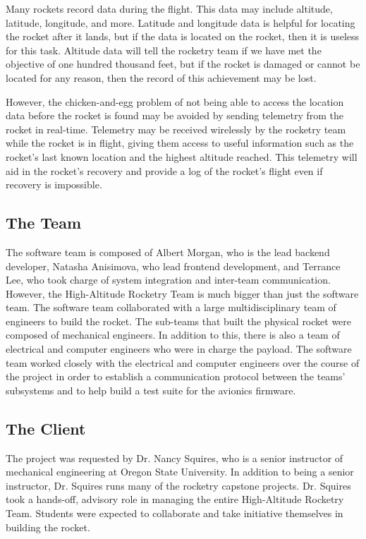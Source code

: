 \documentclass[10pt,draftclsnofoot,onecolumn]{IEEEtran}
\begin{document}
	Many rockets record data during the flight. This data may include
	altitude, latitude, longitude, and more.
	Latitude and longitude
	data is helpful for locating the rocket after it lands, but
	if the data is located on the rocket, then it is useless
	for this task.
	Altitude data will tell the rocketry team if we have
	met the objective of one hundred thousand feet, but if the rocket
	is damaged or cannot be located for any reason, then the record
	of this achievement may be lost.

	However, the chicken-and-egg problem of not being able to access
	the location data before the rocket is found may be avoided by sending
	telemetry from the rocket in real-time.
	Telemetry may be received wirelessly
	by the rocketry team while the rocket is in flight, giving them
	access to useful information such as the rocket's last known location
	and the highest altitude reached. This telemetry will aid in the
	rocket's recovery and provide a log of the rocket's flight even if
	recovery is impossible.


	\subsection{The Team}
	The software team is composed of Albert Morgan, who is the lead backend developer,
	Natasha Anisimova, who lead frontend development,
	and Terrance Lee, who took charge of system integration and inter-team communication.
	However, the High-Altitude Rocketry Team is much bigger than just the software team.
	The software team collaborated with a large multidisciplinary team of engineers to build the rocket.
	The sub-teams that built the physical rocket were composed of mechanical engineers.
	In addition to this, there is also a team of electrical and computer engineers who were
	in charge the payload.
	The software team worked closely with the electrical and computer engineers over the course
	of the project in order to establish a communication protocol between the teams' subsystems
	and to help build a test suite for the avionics firmware.
	

	\subsection{The Client}
	The project was requested by Dr. Nancy Squires, who is a senior
	instructor of mechanical engineering at Oregon State University.
	In addition to being a senior instructor, Dr. Squires runs many
	of the rocketry capstone projects.
	Dr. Squires took a hands-off, advisory role in managing the entire High-Altitude Rocketry Team.
	Students were expected to collaborate and take initiative themselves in building the rocket.
	
\end{document}

